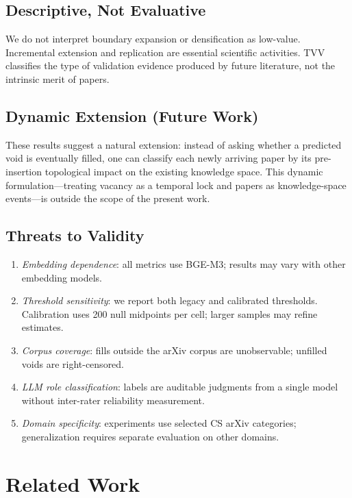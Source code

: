 \documentclass[sigconf]{acmart}
\newcommand{\tvv}{\textsf{TVV}}
\begin{document}
\subsection{Descriptive, Not Evaluative}

We do not interpret boundary expansion or densification as low-value.
Incremental extension and replication are essential scientific activities.
\tvv{} classifies the type of validation evidence produced by future literature,
not the intrinsic merit of papers.

\subsection{Dynamic Extension (Future Work)}

These results suggest a natural extension: instead of asking whether a predicted void
is eventually filled, one can classify each newly arriving paper by its pre-insertion
topological impact on the existing knowledge space.
This dynamic formulation---treating vacancy as a temporal lock and papers as
knowledge-space events---is outside the scope of the present work.

\subsection{Threats to Validity}

\begin{enumerate}
\item \emph{Embedding dependence}: all metrics use BGE-M3; results may vary with
  other embedding models.
\item \emph{Threshold sensitivity}: we report both legacy and calibrated thresholds.
  Calibration uses 200 null midpoints per cell; larger samples may refine estimates.
\item \emph{Corpus coverage}: fills outside the arXiv corpus are unobservable;
  unfilled voids are right-censored.
\item \emph{LLM role classification}: labels are auditable judgments from a single
  model without inter-rater reliability measurement.
\item \emph{Domain specificity}: experiments use selected CS arXiv categories;
  generalization requires separate evaluation on other domains.
\end{enumerate}

\section{Related Work}
\label{sec:related}
\end{document}
